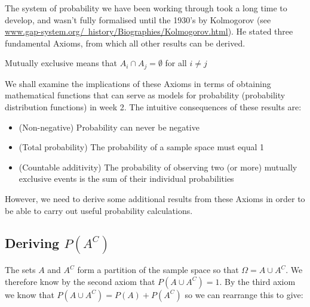 \documentclass[12pt]{extbook}
\begin{document}
The system of probability we have been working through took a long time to develop, and wasn't fully formalised until the 1930's by Kolmogorov (see 
\href{http://www.gap-system.org/~history/Biographies/Kolmogorov.html}{\color{blue}www.gap-system.org/~history/Biographies/Kolmogorov.html}).   He stated three fundamental Axioms, from which all other results can be derived.




Mutually exclusive means that $A_i \cap A_j = \emptyset$ for all $i \neq j$


We shall examine the implications of these Axioms in terms of obtaining mathematical functions that can serve as models for probability (probability distribution functions) in week 2.   The intuitive consequences of these results are:

\begin{itemize}
\item (Non-negative) Probability can never be negative
\item (Total probability) The probability of a sample space must equal 1 
\item (Countable additivity) The probability of observing two (or more) mutually exclusive events is the sum of their individual probabilities
\end{itemize}

However, we need to derive some additional results from these Axioms in order to be able to carry out useful probability calculations.



\subsection{Deriving $P(A^C)$}

The sets $A$ and $A^C$ form a partition of the sample space so that $\Omega = A \cup A^C$.   We therefore know by the second axiom that $P(A \cup A^C) = 1$.   By the third axiom we know that $P(A \cup A^C) = P(A) + P(A^C)$ so we can rearrange this to give:
\end{document}
